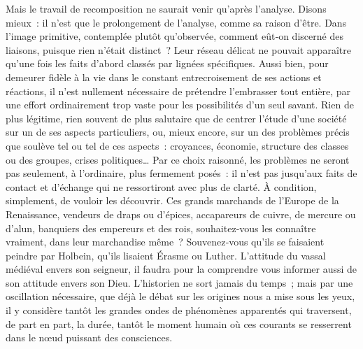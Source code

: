 \documentclass[french,twoside]{book} %
\begin{document}
Mais le travail de recomposition ne saurait venir qu’après l’analyse. Disons mieux : il n’est que le prolongement de l’analyse, comme sa raison d’être. Dans l’image primitive, contemplée plutôt qu’observée, comment eût‑on discerné des liaisons, puisque rien n’était distinct ? Leur réseau délicat ne pouvait apparaître qu’une fois les faits d’abord classés par lignées spécifiques. Aussi bien, pour demeurer fidèle à la vie dans le cons­tant entrecroisement de ses actions et réactions, il n’est nullement néces­saire de prétendre l’embrasser tout entière, par une effort ordinairement trop vaste pour les possibilités d’un seul savant. Rien de plus légitime, rien souvent de plus salutaire que de centrer l’étude d’une société sur un de ses aspects particuliers, ou, mieux encore, sur un des problèmes précis que soulève tel ou tel de ces aspects : croyances, économie, structure des classes ou des groupes, crises politiques… Par ce choix raisonné, les problèmes ne seront pas seulement, à l’ordinaire, plus fermement posés : il n’est pas jusqu’aux faits de contact et d’échange qui ne ressortiront avec plus de clarté. À condition, simplement, de vouloir les découvrir.  
\label{p79} Ces grands marchands de l’Europe de la Renaissance, vendeurs de draps ou d’épices, accapareurs de cuivre, de mercure ou d’alun, banquiers des empereurs et des rois, souhaitez‑vous les connaître vraiment, dans leur marchandise même ? Souvenez‑vous qu’ils se faisaient peindre par Hol­bein, qu’ils lisaient Érasme ou Luther. L’attitude du vassal médiéval envers son seigneur, il faudra pour la comprendre vous informer aussi de son attitude envers son Dieu. L’historien ne sort jamais du temps ; mais par une oscillation nécessaire, que déjà le débat sur les origines nous a mise sous les yeux, il y considère tantôt les grandes ondes de phé­nomènes apparentés qui traversent, de part en part, la durée, tantôt le moment humain où ces courants se resserrent dans le nœud puissant des consciences.
\end{document}
